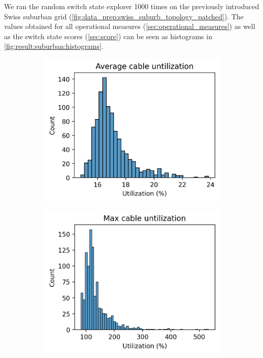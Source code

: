 We ran the random switch state explorer 1000 times on the previously
introduced Swiss suburban grid (\autoref{fig:data_prep:swiss_suburb_topology_patched}).
The values obtained for all operational
measures (\autoref{sec:operational_measures}) as well as the switch state scores
(\autoref{sec:score}) can be seen as histograms in \autoref{fig:result:suburban:histograms}.

\begin{figure}[H]
  \begin{subfigure}{.33\textwidth}
    \centering
    \includegraphics[width=\linewidth]{img/switchstate_exploring/swiss_suburb/histograms/avg_cable_util.png}
    \caption{}
    \label{fig:result:suburban:histograms:avg_cable}
  \end{subfigure}%
  \begin{subfigure}{.33\textwidth}
    \centering
    \includegraphics[width=\linewidth]{img/switchstate_exploring/swiss_suburb/histograms/max_cable_util.png}

\end{subfigure}
\end{figure}
